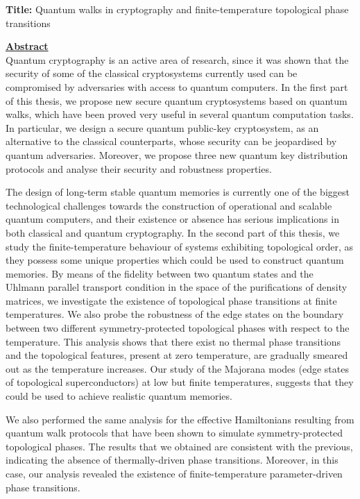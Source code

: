\documentclass[12pt]{report}
\begin{document}
	

\noindent \textbf{Title:} Quantum walks in cryptography and finite-temperature topological phase transitions

\vspace{2\baselineskip}

\underline{\textbf{Abstract}}\\
\noindent Quantum cryptography is an active area of research, since it was shown that the security of some of the classical cryptosystems currently used can be compromised by adversaries with access to quantum computers. In the first part of this thesis, we propose new secure quantum cryptosystems based on quantum walks, which have been proved very useful in several quantum computation tasks. In particular, we design a secure quantum public-key cryptosystem, as an alternative to the classical counterparts, whose security can be jeopardised by quantum adversaries. Moreover, we propose three new quantum key distribution protocols and analyse their security and robustness properties.

The design of long-term stable quantum memories is currently one of the biggest technological challenges towards the construction of operational and scalable quantum computers, and their existence or absence has serious implications in both classical and quantum cryptography. In the second part of this thesis, we study the finite-temperature behaviour of systems exhibiting topological order, as they possess some unique properties which could be used to construct quantum memories. By means of the fidelity between two quantum states and the Uhlmann parallel transport condition in the space of the purifications of density matrices, we investigate the existence of topological phase transitions at finite temperatures. We also probe the robustness of the edge states on the boundary between two different symmetry-protected topological phases with respect to the temperature. This analysis shows that there exist no thermal phase transitions and the topological features, present at zero temperature, are gradually smeared out as the temperature increases. Our study of the Majorana modes (edge states of topological superconductors) at low but finite temperatures, suggests that they could be used to achieve realistic quantum memories.

We also performed the same analysis for the effective Hamiltonians resulting from quantum walk protocols that have been shown to simulate symmetry-protected topological phases. The results that we obtained are consistent with the previous, indicating the absence of thermally-driven phase transitions. Moreover, in this case, our analysis revealed the existence of finite-temperature parameter-driven phase transitions.
\end{document}
